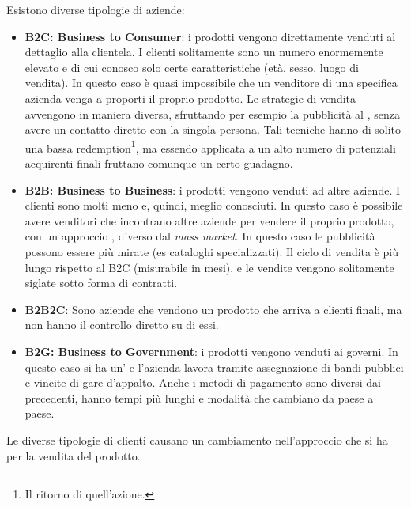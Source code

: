 Esistono diverse tipologie di aziende:
\begin{itemize}
  \item \textbf{B2C: Business to Consumer}: i prodotti vengono direttamente
  venduti al dettaglio alla clientela. I clienti solitamente sono un numero
  enormemente elevato e di cui conosco solo certe caratteristiche (età, sesso,
  luogo di vendita). In questo caso è quasi impossibile che un venditore di una
  specifica azienda venga a proporti il proprio prodotto. Le strategie di
  vendita avvengono in maniera diversa, sfruttando per esempio la pubblicità al
  , senza avere un contatto diretto con la singola
  persona.
  Tali tecniche hanno di solito una bassa redemption\footnote{Il ritorno di
  quell'azione.}, ma essendo applicata a un alto numero di potenziali
  acquirenti finali fruttano comunque un certo guadagno.

  \item \textbf{B2B: Business to Business}: i prodotti vengono venduti ad altre
  aziende. I clienti sono molti meno e, quindi, meglio conosciuti. In questo
  caso è possibile avere venditori che incontrano altre aziende per vendere il
  proprio prodotto, con un approccio , diverso dal
  \textit{mass market}. In questo caso le pubblicità possono essere più mirate
  (es cataloghi specializzati). Il ciclo di vendita è più lungo rispetto al B2C
  (misurabile in mesi), e le vendite vengono solitamente siglate sotto forma di
  contratti.

  \item \textbf{B2B2C}: Sono aziende che vendono un prodotto che arriva a
  clienti finali, ma non hanno il controllo diretto su di essi.

  \item \textbf{B2G: Business to Government}: i prodotti vengono venduti ai
  governi. In questo caso si ha un' e l'azienda lavora tramite assegnazione di bandi pubblici e
  vincite di gare d'appalto. Anche i metodi di pagamento sono diversi dai
  precedenti, hanno tempi più lunghi e modalità che cambiano da paese a paese.
\end{itemize}

Le diverse tipologie di clienti causano un cambiamento nell'approccio che si ha
per la vendita del prodotto.
